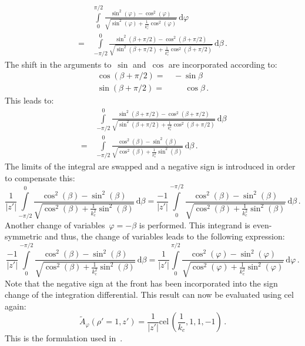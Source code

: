 \begin{align}
 ~&\,  \int\limits_0^{\pi/2} \frac{\sin^2(\varphi) - \cos^2(\varphi)}{\sqrt{\sin^2(\varphi) + \frac{1}{k_c^2} \cos^2(\varphi)}} \,\mathrm{d}\varphi \nonumber \\
 =&\, \int\limits_{-\pi/2}^{0} \frac{\sin^2(\beta + \pi/2) - \cos^2(\beta + \pi/2)}{\sqrt{\sin^2(\beta + \pi/2) + \frac{1}{k_c^2} \cos^2(\beta + \pi/2)}} \,\mathrm{d}\beta \, .
\end{align}
The shift in the arguments to~$\sin$ and~$\cos$ are incorporated according to:
\begin{align}
  \cos(\beta + \pi/2) =&\,          -    \sin{\beta} \\
  \sin(\beta + \pi/2) =&\, \phantom{-}\, \cos{\beta} \, .
\end{align}
This leads to:
\begin{align}
 ~  &\, \int\limits_{-\pi/2}^{0} \frac{\sin^2(\beta + \pi/2) - \cos^2(\beta + \pi/2)}{\sqrt{\sin^2(\beta + \pi/2) + \frac{1}{k_c^2} \cos^2(\beta + \pi/2)}} \,\mathrm{d}\beta \nonumber \\
 ~ =&\, \int\limits_{-\pi/2}^{0} \frac{\cos^2(\beta) - \sin^2(\beta)}{\sqrt{\cos^2(\beta ) + \frac{1}{k_c^2} \sin^2(\beta)}} \,\mathrm{d}\beta \, .
\end{align}
The limits of the integral are swapped and a negative sign is introduced in order to compensate this:
\begin{equation}
   \frac{1}{|z'|} \int\limits_{-\pi/2}^{0} \frac{\cos^2(\beta) - \sin^2(\beta)}{\sqrt{\cos^2(\beta ) + \frac{1}{k_c^2} \sin^2(\beta)}} \,\mathrm{d}\beta
 = \frac{-1}{|z'|} \int\limits_{0}^{-\pi/2} \frac{\cos^2(\beta) - \sin^2(\beta)}{\sqrt{\cos^2(\beta ) + \frac{1}{k_c^2} \sin^2(\beta)}} \,\mathrm{d}\beta \, .
\end{equation}
Another change of variables~$\varphi = -\beta$ is performed.
This integrand is even-symmetric and thus, the change of variables leads to
the following expression:
\begin{equation}
   \frac{-1}{|z'|} \int\limits_{0}^{-\pi/2} \frac{\cos^2(\beta) - \sin^2(\beta)}{\sqrt{\cos^2(\beta ) + \frac{1}{k_c^2} \sin^2(\beta)}} \,\mathrm{d}\beta
 = \frac{1}{|z'|} \int\limits_{0}^{\pi/2} \frac{\cos^2(\varphi) - \sin^2(\varphi)}{\sqrt{\cos^2(\varphi) + \frac{1}{k_c^2} \sin^2(\varphi)}} \,\mathrm{d}\varphi \, .
\end{equation}
Note that the negative sign at the front has been incorporated into the sign change of the integration differential.
This result can now be evaluated using cel again:
\begin{equation}
  \tilde{A}_\varphi(\rho'=1,z') = \frac{1}{|z'|} \textrm{cel}\,\left(\frac{1}{k_c}, 1, 1, -1\right) \, .
\end{equation}
This is the formulation used in~.


